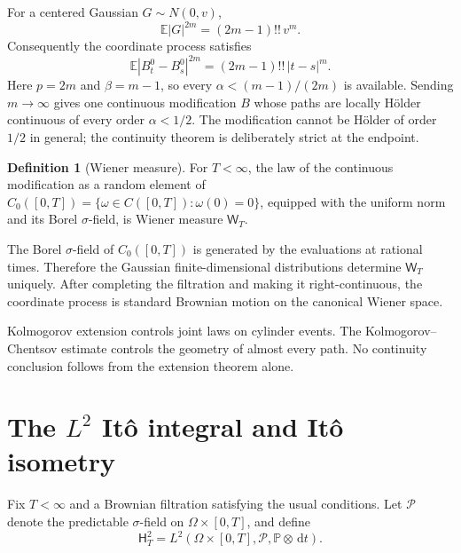 \documentclass[10pt,a4paper]{article}
\numberwithin{equation}{section}
\theoremstyle{blueplain}
\theoremstyle{definition}
\newtheorem{definition}[theorem]{Definition}
\newcommand{\E}{\mathbb E}
\newcommand{\Pp}{\mathbb P}
\newcommand{\dd}{\,\mathrm d}
\begin{document}
For a centered Gaussian \(G\sim N(0,v)\),
\begin{equation}
  \E|G|^{2m}=(2m-1)!!\,v^m.
  \label{eq:gaussian-even-moment}
\end{equation}
Consequently the coordinate process satisfies
\begin{equation}
  \E|B_t^0-B_s^0|^{2m}
  =(2m-1)!!\,|t-s|^m.
  \label{eq:brownian-kc-moment}
\end{equation}
Here \(p=2m\) and \(\beta=m-1\), so every
\(\alpha<(m-1)/(2m)\) is available.  Sending \(m\to\infty\) gives one
continuous modification \(B\) whose paths are locally H\"older continuous
of every order \(\alpha<1/2\).  The modification cannot be H\"older of order
\(1/2\) in general; the continuity theorem is deliberately strict at the
endpoint.

\begin{definition}[Wiener measure]
For \(T<\infty\), the law of the continuous modification as a random element
of \(C_0([0,T])=\{\omega\in C([0,T]):\omega(0)=0\}\), equipped with the
uniform norm and its Borel \(\sigma\)-field, is Wiener measure
\(\mathsf W_T\).
\end{definition}

The Borel \(\sigma\)-field of \(C_0([0,T])\) is generated by the evaluations
at rational times.  Therefore the Gaussian finite-dimensional distributions
determine \(\mathsf W_T\) uniquely.  After completing the filtration and making
it right-continuous, the coordinate process is standard Brownian motion on the
canonical Wiener space.

\begin{keybox}
Kolmogorov extension controls joint laws on cylinder events.  The
Kolmogorov--Chentsov estimate controls the geometry of almost every path.  No
continuity conclusion follows from the extension theorem alone.
\end{keybox}

\clearpage
\section{The \texorpdfstring{$L^2$}{L2} It\^o integral and It\^o isometry}
\label{sec:ito-integral}

Fix \(T<\infty\) and a Brownian filtration satisfying the usual conditions.
Let \(\mathcal P\) denote the predictable \(\sigma\)-field on
\(\Omega\times[0,T]\), and define
\begin{equation}
  \mathsf H_T^2
  =L^2(\Omega\times[0,T],\mathcal P,
      \Pp\otimes\dd t).
  \label{eq:H2-space}
\end{equation}
\end{document}
